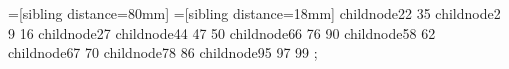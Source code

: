 
			          =[sibling distance=80mm] 
                                  =[sibling distance=18mm]
				  child{node{22 35 }child{node{2 9 16 }}child{node{27 }}child{node{44 47 50 }}}child{node{66 76 90 }child{node{58 62 }}child{node{67 70 }}child{node{78 86 }}child{node{95 97 99 }}};